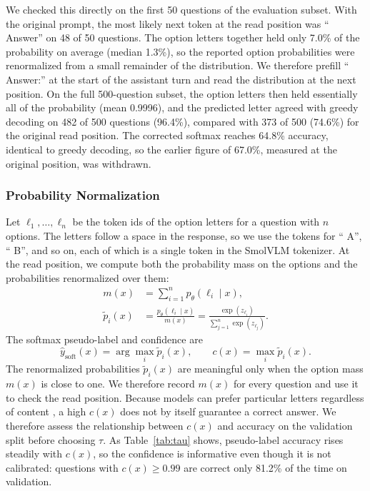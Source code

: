 \documentclass{article}
\begin{document}
We checked this directly on the first 50 questions of the evaluation subset. With the original prompt, the most likely next token at the read position was `` Answer'' on 48 of 50 questions. The option letters together held only 7.0\% of the probability on average (median 1.3\%), so the reported option probabilities were renormalized from a small remainder of the distribution. We therefore prefill `` Answer:'' at the start of the assistant turn and read the distribution at the next position. On the full 500-question subset, the option letters then held essentially all of the probability (mean 0.9996), and the predicted letter agreed with greedy decoding on 482 of 500 questions (96.4\%), compared with 373 of 500 (74.6\%) for the original read position. The corrected softmax reaches 64.8\% accuracy, identical to greedy decoding, so the earlier figure of 67.0\%, measured at the original position, was withdrawn.

\subsubsection{Probability Normalization}
Let $\ell_1, \ldots, \ell_n$ be the token ids of the option letters for a question with $n$ options. The letters follow a space in the response, so we use the tokens for `` A'', `` B'', and so on, each of which is a single token in the SmolVLM tokenizer. At the read position, we compute both the probability mass on the options and the probabilities renormalized over them:
\begin{align}
m(x) &= \sum_{i=1}^{n} p_\theta(\ell_i \mid x), \\
\tilde{p}_i(x) &= \frac{p_\theta(\ell_i \mid x)}{m(x)} = \frac{\exp(z_{\ell_i})}{\sum_{j=1}^{n} \exp(z_{\ell_j})}.
\end{align}
The softmax pseudo-label and confidence are
\begin{equation}
\hat{y}_{\text{soft}}(x) = \arg\max_i \tilde{p}_i(x), \qquad c(x) = \max_i \tilde{p}_i(x).
\end{equation}
The renormalized probabilities $\tilde{p}_i(x)$ are meaningful only when the option mass $m(x)$ is close to one. We therefore record $m(x)$ for every question and use it to check the read position. Because models can prefer particular letters regardless of content \citep{zheng2024selectionbias}, a high $c(x)$ does not by itself guarantee a correct answer. We therefore assess the relationship between $c(x)$ and accuracy on the validation split before choosing $\tau$. As Table~\ref{tab:tau} shows, pseudo-label accuracy rises steadily with $c(x)$, so the confidence is informative even though it is not calibrated: questions with $c(x) \geq 0.99$ are correct only 81.2\% of the time on validation.
\end{document}
